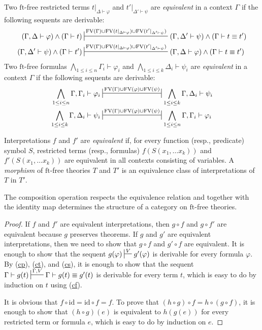 \documentclass[reqno]{amsart}
\newcommand{\axref}[1]{(\hyperref[ax:#1]{#1})}
\theoremstyle{definition}
\theoremstyle{remark}
\newcommand{\fs}[1]{\mathrm{#1}}
\newcommand{\FV}{\fs{FV}}
\newcommand{\ft}{\fs{ft}}
\newcommand{\id}{\fs{id}}
\numberwithin{figure}{section}
\begin{document}
Two $\ft$-free restricted terms $t|_{\Delta \vdash \varphi}$ and $t'|_{\Delta' \vdash \psi}$ are \emph{equivalent} in a context $\Gamma$ if the following sequents are derivable:
\begin{align*}
(\Gamma, \Delta \vdash \varphi) \land (\Gamma \vdash t) & \sststile{}{\FV(\Gamma) \cup \FV(t|_{\Delta \vdash \varphi}) \cup \FV(t'|_{\Delta' \vdash \psi})} (\Gamma, \Delta' \vdash \psi) \land (\Gamma \vdash t \equiv t') \\
(\Gamma, \Delta' \vdash \psi) \land (\Gamma \vdash t') & \sststile{}{\FV(\Gamma) \cup \FV(t|_{\Delta \vdash \varphi}) \cup \FV(t'|_{\Delta' \vdash \psi})} (\Gamma, \Delta \vdash \varphi) \land (\Gamma \vdash t \equiv t')
\end{align*}
Two $\ft$-free formulas $\bigwedge_{1 \leq i \leq n} \Gamma_i \vdash \varphi_i$ and $\bigwedge_{1 \leq i \leq k} \Delta_i \vdash \psi_i$ are \emph{equivalent} in a context $\Gamma$
if the following sequents are derivable:
\begin{align*}
\bigwedge_{1 \leq i \leq n} \Gamma, \Gamma_i \vdash \varphi_i & \ssststile{}{\FV(\Gamma) \cup \FV(\varphi) \cup \FV(\psi)} \bigwedge_{1 \leq i \leq k} \Gamma, \Delta_i \vdash \psi_i \\
\bigwedge_{1 \leq i \leq k} \Gamma, \Delta_i \vdash \psi_i & \ssststile{}{\FV(\Gamma) \cup \FV(\varphi) \cup \FV(\psi)} \bigwedge_{1 \leq i \leq n} \Gamma, \Gamma_i \vdash \varphi_i
\end{align*}

Interpretations $f$ and $f'$ are \emph{equivalent} if, for every function (resp., predicate) symbol $S$, restricted terms (resp., formulas) $f(S(x_1, \ldots x_k))$ and $f'(S(x_1, \ldots x_k))$ are equivalent in all contexts consisting of variables.
A \emph{morphism} of $\ft$-free theories $T$ and $T'$ is an equivalence class of interpretations of $T$ in $T'$.

\begin{prop}
The composition operation respects the equivalence relation and together with the identity map determines the structure of a category on $\ft$-free theories.
\end{prop}
\begin{proof}
If $f$ and $f'$ are equivalent interpretations, then $g \circ f$ and $g \circ f'$ are equivalent because $g$ preserves theorems.
If $g$ and $g'$ are equivalent interpretations, then we need to show that $g \circ f$ and $g' \circ f$ are equivalent.
It is enough to show that the sequent $g(\varphi) \sststile{}{V} g'(\varphi)$ is derivable for every formula $\varphi$.
By \axref{cp}, \axref{ct}, and \axref{cs}, it is enough to show that the sequent $\Gamma \vdash g(t) \sststile{}{\Gamma,V} \Gamma \vdash g(t) \equiv g'(t)$ is derivable for every term $t$, which is easy to do by induction on $t$ using \axref{cf}.

It is obvious that $f \circ \id = \id \circ f = f$.
To prove that $(h \circ g) \circ f = h \circ (g \circ f)$, it is enough to show that $(h \circ g)(e)$ is equivalent to $h(g(e))$ for every restricted term or formula $e$, which is easy to do by induction on $e$.
\end{proof}
\end{document}
